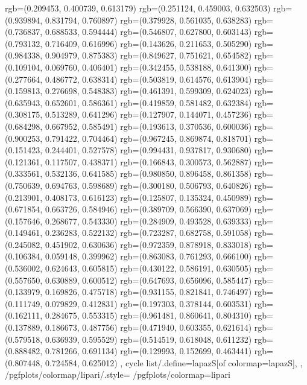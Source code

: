 {{{					rgb=(0.209453, 0.400739, 0.613179)
					rgb=(0.251124, 0.459003, 0.632503)
					rgb=(0.939894, 0.831794, 0.760897)
					rgb=(0.379928, 0.561035, 0.638283)
					rgb=(0.736837, 0.688533, 0.594444)
					rgb=(0.546807, 0.627800, 0.603143)
					rgb=(0.793132, 0.716409, 0.616996)
					rgb=(0.143626, 0.211653, 0.505290)
					rgb=(0.984338, 0.904979, 0.875383)
					rgb=(0.849627, 0.751621, 0.654582)
					rgb=(0.109104, 0.069760, 0.406401)
					rgb=(0.342455, 0.538188, 0.641300)
					rgb=(0.277664, 0.486772, 0.638314)
					rgb=(0.503819, 0.614576, 0.613904)
					rgb=(0.159813, 0.276698, 0.548383)
					rgb=(0.461391, 0.599309, 0.624023)
					rgb=(0.635943, 0.652601, 0.586361)
					rgb=(0.419859, 0.581482, 0.632384)
					rgb=(0.308175, 0.513289, 0.641296)
					rgb=(0.127907, 0.144071, 0.457236)
					rgb=(0.684298, 0.667952, 0.585491)
					rgb=(0.193613, 0.370536, 0.600036)
					rgb=(0.900253, 0.791422, 0.704464)
					rgb=(0.967245, 0.869874, 0.818701)
					rgb=(0.151423, 0.244401, 0.527578)
					rgb=(0.994431, 0.937817, 0.930680)
					rgb=(0.121361, 0.117507, 0.438371)
					rgb=(0.166843, 0.300573, 0.562887)
					rgb=(0.333561, 0.532136, 0.641585)
					rgb=(0.980850, 0.896458, 0.861358)
					rgb=(0.750639, 0.694763, 0.598689)
					rgb=(0.300180, 0.506793, 0.640826)
					rgb=(0.213901, 0.408173, 0.616123)
					rgb=(0.125807, 0.135324, 0.450989)
					rgb=(0.671854, 0.663726, 0.584946)
					rgb=(0.389709, 0.566390, 0.637069)
					rgb=(0.157646, 0.268677, 0.543330)
					rgb=(0.284909, 0.493528, 0.639333)
					rgb=(0.149461, 0.236283, 0.522132)
					rgb=(0.723287, 0.682758, 0.591058)
					rgb=(0.245082, 0.451902, 0.630636)
					rgb=(0.972359, 0.878918, 0.833018)
					rgb=(0.106384, 0.059148, 0.399962)
					rgb=(0.863083, 0.761293, 0.666100)
					rgb=(0.536002, 0.624643, 0.605815)
					rgb=(0.430122, 0.586191, 0.630505)
					rgb=(0.557650, 0.630889, 0.600512)
					rgb=(0.647693, 0.656096, 0.585447)
					rgb=(0.133979, 0.169826, 0.475718)
					rgb=(0.931155, 0.821841, 0.746497)
					rgb=(0.111749, 0.079829, 0.412831)
					rgb=(0.197303, 0.378144, 0.603531)
					rgb=(0.162111, 0.284675, 0.553315)
					rgb=(0.961481, 0.860641, 0.804310)
					rgb=(0.137889, 0.186673, 0.487756)
					rgb=(0.471940, 0.603355, 0.621614)
					rgb=(0.579518, 0.636939, 0.595529)
					rgb=(0.514519, 0.618048, 0.611232)
					rgb=(0.888482, 0.781266, 0.691134)
					rgb=(0.129993, 0.152699, 0.463441)
					rgb=(0.807448, 0.724584, 0.625012)
			},
		cycle list/.define={lapazS}{[of colormap=lapazS]},
		},
		/pgfplots/colormap/lipari/.style={
			/pgfplots/colormap={lipari}{%
}}}
